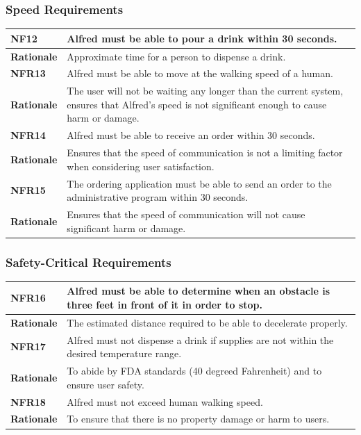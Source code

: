 \documentclass [11pt]{article}
\begin{document}
\subsubsection{Speed Requirements }

\begin{longtable}{| p{ } | p{ } | }\hline 
\rowcolor{tableCell}\textbf{NF12} & Alfred must be able to pour a drink within 30 seconds. \\ \hline
\textbf{Rationale} & Approximate time for a person to dispense a drink. \\ \hline 
\rowcolor{tableCell}\textbf{NFR13} & Alfred must be able to move at the walking speed of a human. \\ \hline
\textbf{Rationale} & The user will not be waiting any longer than the current system, ensures that Alfred's speed is not significant enough to cause harm or damage. \\ \hline 
\rowcolor{tableCell}\textbf{NFR14} &  Alfred must be able to receive an order within 30 seconds. \\ \hline
\textbf{Rationale} & Ensures that the speed of communication is not a limiting factor when considering user satisfaction.\\ \hline
\rowcolor{tableCell}\textbf{NFR15} &  The ordering application must be able to send an order to the administrative program within 30 seconds. \\ \hline
\textbf{Rationale} & Ensures that the speed of communication will not cause significant harm or damage.\\ \hline
\end{longtable}
	

\subsubsection{Safety-Critical Requirements }

\begin{longtable}{| p{ } | p{ } | }\hline 
\rowcolor{tableCell}\textbf{NFR16} &  Alfred must be able to determine when an obstacle is three feet in front of it in order to stop. \\ \hline
\textbf{Rationale} & The estimated distance required to be able to decelerate properly.\\ \hline 
\rowcolor{tableCell}\textbf{NFR17} & Alfred must not dispense a drink if supplies are not within the desired temperature range. \\ \hline
\textbf{Rationale} & To abide by FDA standards (40 degreed Fahrenheit) and to ensure user safety.\\ \hline 
\rowcolor{tableCell}\textbf{NFR18} & Alfred must not exceed human walking speed.\\ \hline
\textbf{Rationale} & To ensure that there is no property damage or harm to users.\\ \hline 
\end{longtable}
\end{document}
